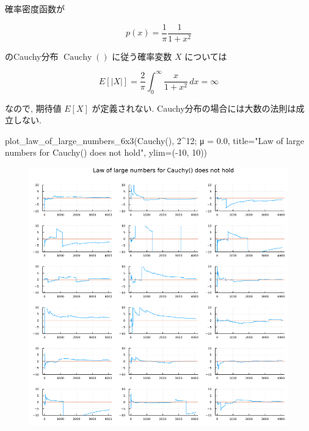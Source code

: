 \documentclass[
  letterpaper,
  DIV=11,
  numbers=noendperiod]{scrartcl}
\newenvironment{Shaded}{\begin{snugshade}}{\end{snugshade}}
\newcommand{\FloatTok}[1]{\textcolor[rgb]{0.68,0.00,0.00}{#1}}
\newcommand{\FunctionTok}[1]{\textcolor[rgb]{0.28,0.35,0.67}{#1}}
\newcommand{\NormalTok}[1]{\textcolor[rgb]{0.00,0.23,0.31}{#1}}
\newcommand{\OperatorTok}[1]{\textcolor[rgb]{0.37,0.37,0.37}{#1}}
\newcommand{\StringTok}[1]{\textcolor[rgb]{0.13,0.47,0.30}{#1}}
\begin{document}
確率密度函数が

\[
p(x) = \frac{1}{\pi}\frac{1}{1 + x^2}
\]

のCauchy分布 \(\operatorname{Cauchy}()\) に従う確率変数 \(X\) については

\[
E[|X|] = \frac{2}{\pi}\int_0^\infty \frac{x}{1+x^2}\,dx = \infty
\]

なので, 期待値 \(E[X]\) が定義されない.
Cauchy分布の場合には大数の法則は成立しない.

\begin{Shaded}
\begin{Highlighting}[]
\FunctionTok{plot\_law\_of\_large\_numbers\_6x3}\NormalTok{(}\FunctionTok{Cauchy}\NormalTok{(), }\FloatTok{2}\OperatorTok{\^{}}\FloatTok{12}\NormalTok{; μ }\OperatorTok{=} \FloatTok{0.0}\NormalTok{,}
\NormalTok{    title}\OperatorTok{=}\StringTok{"Law of large numbers for Cauchy() does not hold"}\NormalTok{, ylim}\OperatorTok{=}\NormalTok{(}\OperatorTok{{-}}\FloatTok{10}\NormalTok{, }\FloatTok{10}\NormalTok{))}
\end{Highlighting}
\end{Shaded}

\begin{figure}[H]

{\centering \includegraphics{05 Central limit theorem_files/figure-pdf/cell-16-output-1.png}

}

\end{figure}
\end{document}
